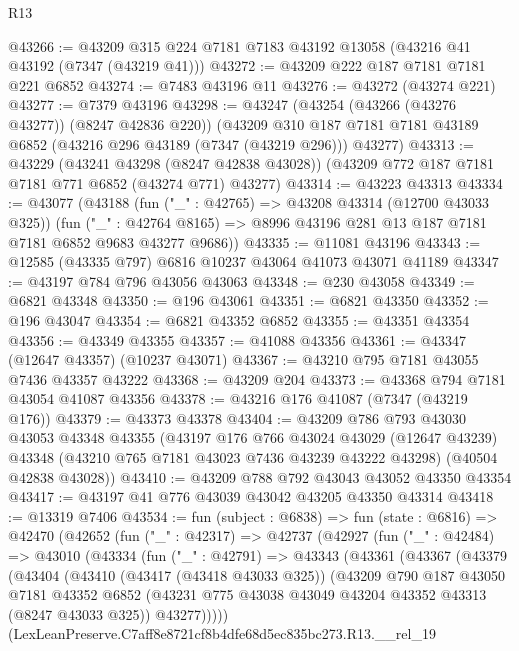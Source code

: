 \begin{lexlean}{R13}
\begin{coremodule}
@43266 := @43209 @315 @224 @7181 @7183 @43192 @13058 (@43216 @41 @43192 (@7347 (@43219 @41)))
@43272 := @43209 @222 @187 @7181 @7181 @221 @6852
@43274 := @7483 @43196 @11
@43276 := @43272 (@43274 @221)
@43277 := @7379 @43196
@43298 := @43247
    (@43254 (@43266 (@43276 @43277)) (@8247 @42836 @220))
    (@43209 @310 @187 @7181 @7181 @43189 @6852 (@43216 @296 @43189 (@7347 (@43219 @296))) @43277)
@43313 := @43229
    (@43241 @43298 (@8247 @42838 @43028))
    (@43209 @772 @187 @7181 @7181 @771 @6852 (@43274 @771) @43277)
@43314 := @43223 @43313
@43334 := @43077
    (@43188
      (fun ("_" : @42765) => @43208 @43314 (@12700 @43033 @325))
      (fun ("_" : @42764 @8165) => @8996 @43196 @281 @13 @187 @7181 @7181 @6852 @9683 @43277 @9686))
@43335 := @11081 @43196
@43343 := @12585 (@43335 @797) @6816 @10237 @43064 @41073 @43071 @41189
@43347 := @43197 @784 @796 @43056 @43063
@43348 := @230 @43058
@43349 := @6821 @43348
@43350 := @196 @43061
@43351 := @6821 @43350
@43352 := @196 @43047
@43354 := @6821 @43352 @6852
@43355 := @43351 @43354
@43356 := @43349 @43355
@43357 := @41088 @43356
@43361 := @43347 (@12647 @43357) (@10237 @43071)
@43367 := @43210 @795 @7181 @43055 @7436 @43357 @43222
@43368 := @43209 @204
@43373 := @43368 @794 @7181 @43054 @41087 @43356
@43378 := @43216 @176 @41087 (@7347 (@43219 @176))
@43379 := @43373 @43378
@43404 := @43209
    @786
    @793
    @43030
    @43053
    @43348
    @43355
    (@43197
      @176
      @766
      @43024
      @43029
      (@12647 @43239)
      @43348
      (@43210 @765 @7181 @43023 @7436 @43239 @43222 @43298)
      (@40504 @42838 @43028))
@43410 := @43209 @788 @792 @43043 @43052 @43350 @43354
@43417 := @43197 @41 @776 @43039 @43042 @43205 @43350 @43314
@43418 := @13319 @7406
@43534 := fun (subject : @6838) =>
  fun (state : @6816) =>
  @42470
    (@42652
      (fun ("_" : @42317) =>
      @42737
        (@42927
          (fun ("_" : @42484) =>
          @43010
            (@43334
              (fun ("_" : @42791) =>
              @43343
                (@43361
                  (@43367
                    (@43379
                      (@43404
                        (@43410
                          (@43417 (@43418 @43033 @325))
                          (@43209
                            @790
                            @187
                            @43050
                            @7181
                            @43352
                            @6852
                            (@43231 @775 @43038 @43049 @43204 @43352 @43313 (@8247 @43033 @325))
                            @43277)))))
                  (LexLeanPreserve.C7aff8e8721cf8b4dfe68d5ec835bc273.R13.__rel_19

\end{coremodule}
\end{lexlean}
